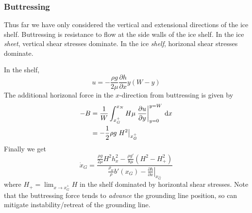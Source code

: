 \documentclass{jknotes}
\begin{document}
\subsubsection{Buttressing}
Thus far we have only considered the vertical and extensional directions of
the ice shelf. Buttressing is resistance to flow at the side walls of the ice
shelf. In the ice \emph{sheet}, vertical shear stresses dominate. In the ice
\emph{shelf}, horizonal shear stresses dominate.
\begin{center}
\end{center}

In the shelf,
\begin{equation}
	u = -\frac{\rho g}{2\mu}\frac{\partial h}{\partial x} y(W-y)
\end{equation}
The additional horizonal force in the $x$-direction from buttressing is given
by
\begin{align}
	-B &= \frac{1}{W}\int_{x_G^+}^{x_N} H\mu\left.\frac{\partial u}{\partial
	y}\right|_{y=0}^{y=W} \,
	\diffd x \\
	   &= -\frac{1}{2}\rho g \left.H^2\right|_{x_G^+}
\end{align}
Finally we get
\begin{equation}
	\dot{x}_G = \frac{\frac{\rho g}{2\mu} H^2 h_x^2 - \frac{\rho g'}{8\mu}
	(H^2-H_+^2)}{\frac{\rho_w}{\rho}b'(x_G) - \left.\frac{\partial h}{\partial
	x}\right|_{x_G^-}}
\end{equation}
where $H_+ = \lim_{x\to x_G^+} H$ in the shelf dominated by horizontal shear
stresses. Note that the buttressing force tends to \emph{advance} the
grounding line position, so can mitigate instability/retreat of the grounding
line.
\end{document}
